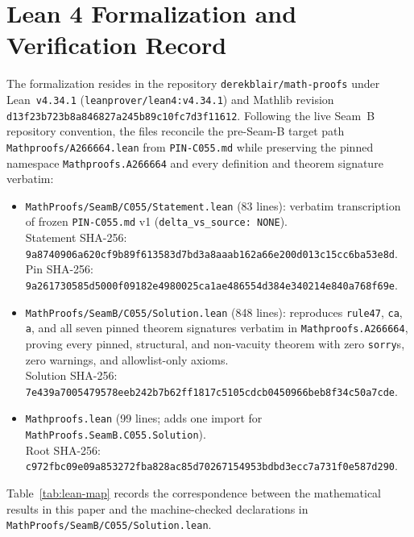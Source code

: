 \documentclass[11pt]{article}
\theoremstyle{definition}
\begin{document}
\section{Lean 4 Formalization and Verification Record}

The formalization resides in the repository \texttt{derekblair/math-proofs} under Lean~\texttt{v4.34.1} (\nolinkurl{leanprover/lean4:v4.34.1}) and Mathlib revision {\small\nolinkurl{d13f23b723b8a846827a245b89c10fc7d3f11612}}. Following the live Seam~B repository convention, the files reconcile the pre-Seam-B target path \nolinkurl{Mathproofs/A266664.lean} from \texttt{PIN-C055.md} while preserving the pinned namespace \nolinkurl{Mathproofs.A266664} and every definition and theorem signature verbatim:
\begin{itemize}\setlength{\itemsep}{2pt}
\item \nolinkurl{MathProofs/SeamB/C055/Statement.lean} (83 lines): verbatim transcription of frozen \texttt{PIN-C055.md} v1 (\texttt{delta\_vs\_source: NONE}).\\
Statement SHA-256: {\small\nolinkurl{9a8740906a620cf9b89f613583d7bd3a8aaab162a66e200d013c15cc6ba53e8d}}.\\
Pin SHA-256: {\small\nolinkurl{9a261730585d5000f09182e4980025ca1ae486554d384e340214e840a768f69e}}.
\item \nolinkurl{MathProofs/SeamB/C055/Solution.lean} (848 lines): reproduces \texttt{rule47}, \texttt{ca}, \texttt{a}, and all seven pinned theorem signatures verbatim in \nolinkurl{Mathproofs.A266664}, proving every pinned, structural, and non-vacuity theorem with zero \texttt{sorry}s, zero warnings, and allowlist-only axioms.\\
Solution SHA-256: {\small\nolinkurl{7e439a7005479578eeb242b7b62ff1817c5105cdcb0450966beb8f34c50a7cde}}.
\item \nolinkurl{Mathproofs.lean} (99 lines; adds one import for \nolinkurl{MathProofs.SeamB.C055.Solution}).\\
Root SHA-256: {\small\nolinkurl{c972fbc09e09a853272fba828ac85d70267154953bdbd3ecc7a731f0e587d290}}.
\end{itemize}

Table~\ref{tab:lean-map} records the correspondence between the mathematical results in this paper and the machine-checked declarations in \nolinkurl{MathProofs/SeamB/C055/Solution.lean}.
\end{document}
